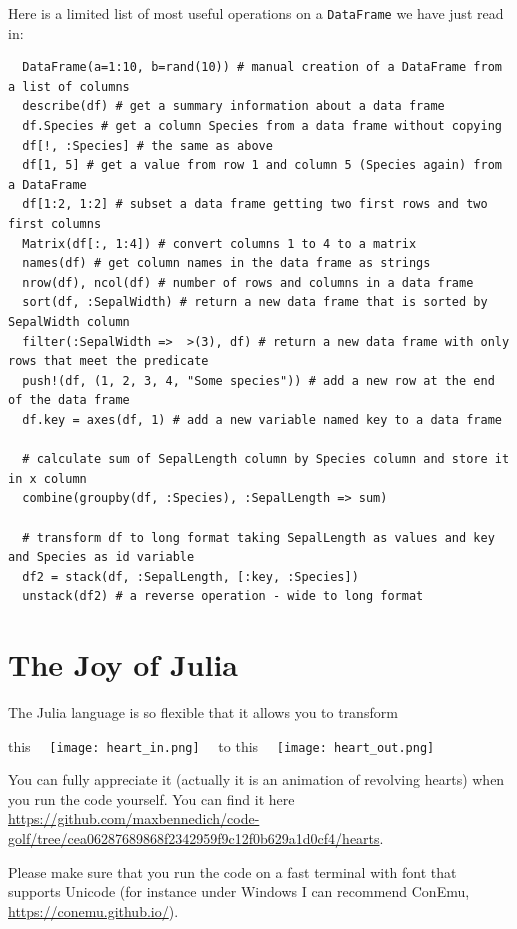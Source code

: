\documentclass[10pt,a4paper]{article}
\begin{document}
Here is a limited list of most useful operations on a \lstinline|DataFrame| we have just read in:
\begin{lstlisting}
  DataFrame(a=1:10, b=rand(10)) # manual creation of a DataFrame from a list of columns
  describe(df) # get a summary information about a data frame
  df.Species # get a column Species from a data frame without copying
  df[!, :Species] # the same as above
  df[1, 5] # get a value from row 1 and column 5 (Species again) from a DataFrame
  df[1:2, 1:2] # subset a data frame getting two first rows and two first columns
  Matrix(df[:, 1:4]) # convert columns 1 to 4 to a matrix
  names(df) # get column names in the data frame as strings
  nrow(df), ncol(df) # number of rows and columns in a data frame
  sort(df, :SepalWidth) # return a new data frame that is sorted by SepalWidth column
  filter(:SepalWidth =>  >(3), df) # return a new data frame with only rows that meet the predicate
  push!(df, (1, 2, 3, 4, "Some species")) # add a new row at the end of the data frame
  df.key = axes(df, 1) # add a new variable named key to a data frame

  # calculate sum of SepalLength column by Species column and store it in x column
  combine(groupby(df, :Species), :SepalLength => sum)

  # transform df to long format taking SepalLength as values and key and Species as id variable
  df2 = stack(df, :SepalLength, [:key, :Species])
  unstack(df2) # a reverse operation - wide to long format
\end{lstlisting}

\section{The Joy of Julia}

The Julia language is so flexible that it allows you to transform

this$\quad$
\texttt{[image: heart\_in.png]}
$\quad$to this$\quad$
\texttt{[image: heart\_out.png]}

You can fully appreciate it (actually it is an animation of revolving hearts) when you run the code yourself. You can find it here
\url{https://github.com/maxbennedich/code-golf/tree/cea06287689868f2342959f9c12f0b629a1d0cf4/hearts}.

Please make sure that you run the code on a fast terminal with font that supports Unicode (for instance under Windows I can recommend ConEmu, \url{https://conemu.github.io/}).
\end{document}
